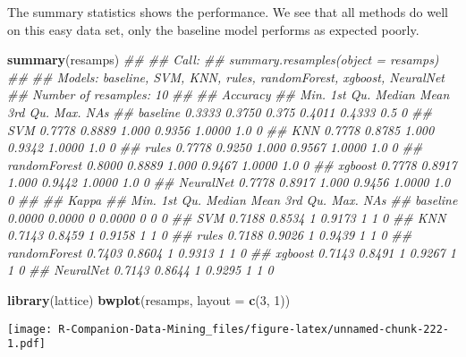 \documentclass[
  notitlepage]{book}
\newenvironment{Shaded}{\begin{snugshade}}{\end{snugshade}}
\newcommand{\CommentTok}[1]{\textcolor[rgb]{0.56,0.35,0.01}{\textit{#1}}}
\newcommand{\DataTypeTok}[1]{\textcolor[rgb]{0.13,0.29,0.53}{#1}}
\newcommand{\DecValTok}[1]{\textcolor[rgb]{0.00,0.00,0.81}{#1}}
\newcommand{\KeywordTok}[1]{\textcolor[rgb]{0.13,0.29,0.53}{\textbf{#1}}}
\newcommand{\NormalTok}[1]{#1}
\begin{document}
The summary statistics shows the performance. We see that all
methods do well on this easy data set, only the baseline model performs
as expected poorly.

\begin{Shaded}
\begin{Highlighting}[]
\KeywordTok{summary}\NormalTok{(resamps)}
\CommentTok{\#\# }
\CommentTok{\#\# Call:}
\CommentTok{\#\# summary.resamples(object = resamps)}
\CommentTok{\#\# }
\CommentTok{\#\# Models: baseline, SVM, KNN, rules, randomForest, xgboost, NeuralNet }
\CommentTok{\#\# Number of resamples: 10 }
\CommentTok{\#\# }
\CommentTok{\#\# Accuracy }
\CommentTok{\#\#                Min. 1st Qu. Median   Mean 3rd Qu. Max. NA\textquotesingle{}s}
\CommentTok{\#\# baseline     0.3333  0.3750  0.375 0.4011  0.4333  0.5    0}
\CommentTok{\#\# SVM          0.7778  0.8889  1.000 0.9356  1.0000  1.0    0}
\CommentTok{\#\# KNN          0.7778  0.8785  1.000 0.9342  1.0000  1.0    0}
\CommentTok{\#\# rules        0.7778  0.9250  1.000 0.9567  1.0000  1.0    0}
\CommentTok{\#\# randomForest 0.8000  0.8889  1.000 0.9467  1.0000  1.0    0}
\CommentTok{\#\# xgboost      0.7778  0.8917  1.000 0.9442  1.0000  1.0    0}
\CommentTok{\#\# NeuralNet    0.7778  0.8917  1.000 0.9456  1.0000  1.0    0}
\CommentTok{\#\# }
\CommentTok{\#\# Kappa }
\CommentTok{\#\#                Min. 1st Qu. Median   Mean 3rd Qu. Max. NA\textquotesingle{}s}
\CommentTok{\#\# baseline     0.0000  0.0000      0 0.0000       0    0    0}
\CommentTok{\#\# SVM          0.7188  0.8534      1 0.9173       1    1    0}
\CommentTok{\#\# KNN          0.7143  0.8459      1 0.9158       1    1    0}
\CommentTok{\#\# rules        0.7188  0.9026      1 0.9439       1    1    0}
\CommentTok{\#\# randomForest 0.7403  0.8604      1 0.9313       1    1    0}
\CommentTok{\#\# xgboost      0.7143  0.8491      1 0.9267       1    1    0}
\CommentTok{\#\# NeuralNet    0.7143  0.8644      1 0.9295       1    1    0}
\end{Highlighting}
\end{Shaded}

\begin{Shaded}
\begin{Highlighting}[]
\KeywordTok{library}\NormalTok{(lattice)}
\KeywordTok{bwplot}\NormalTok{(resamps, }\DataTypeTok{layout =} \KeywordTok{c}\NormalTok{(}\DecValTok{3}\NormalTok{, }\DecValTok{1}\NormalTok{))}
\end{Highlighting}
\end{Shaded}

\texttt{[image: R-Companion-Data-Mining\_files/figure-latex/unnamed-chunk-222-1.pdf]}
\end{document}
